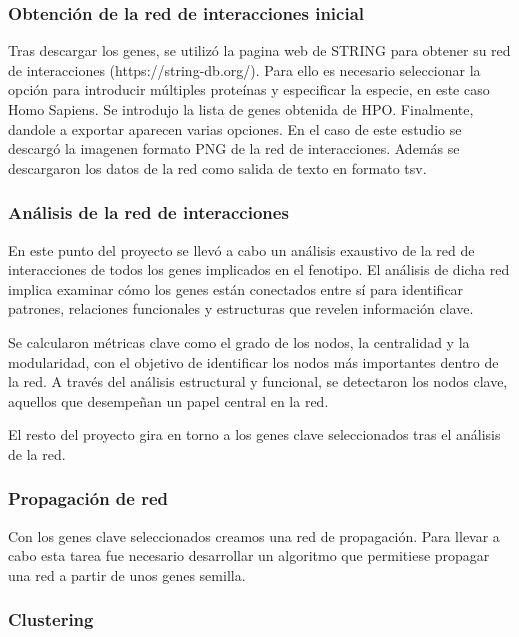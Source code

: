 \subsubsection{Obtención de la red de interacciones inicial}

Tras descargar los genes, se utilizó la pagina web de STRING para obtener su red de interacciones (https://string-db.org/). Para ello es necesario seleccionar la opción para introducir múltiples proteínas y especificar la especie, en este caso Homo Sapiens. Se introdujo la lista de genes obtenida de HPO. Finalmente, dandole a exportar aparecen varias opciones. En el caso de este estudio se descargó la imagenen formato PNG de la red de interacciones. Además se descargaron los datos de la red como salida de texto en formato tsv.


\subsubsection{Análisis de la red de interacciones}

En este punto del proyecto se llevó a cabo un análisis exaustivo de la red de interacciones de todos los genes implicados en el fenotipo. El análisis de dicha red  implica examinar cómo los genes están conectados entre sí para identificar patrones, relaciones funcionales y estructuras que revelen información clave. 

Se calcularon métricas clave como el grado de los nodos, la centralidad y la modularidad, con el objetivo de identificar los nodos más importantes dentro de la red. A través del análisis estructural y funcional, se detectaron los nodos clave, aquellos que desempeñan un papel central en la red.

El resto del proyecto gira en torno a los genes clave seleccionados tras el análisis de la red.

\subsubsection{Propagación de red}

Con los genes clave seleccionados creamos una red de propagación. Para llevar a cabo esta tarea fue necesario desarrollar un algoritmo que permitiese propagar una red a partir de unos genes semilla.


\subsubsection{Clustering}


